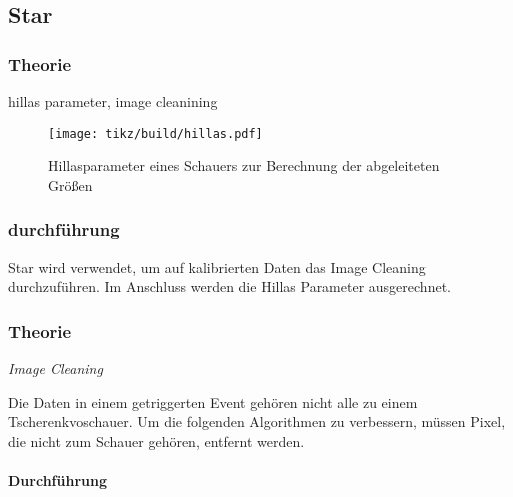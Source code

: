 \subsection{Star}%
\label{sub:star}
\subsubsection{Theorie}
hillas parameter, image cleanining
\begin{figure}
	\centering
	\texttt{[image: tikz/build/hillas.pdf]}
	\caption{Hillasparameter eines Schauers zur Berechnung der abgeleiteten Größen}
	\label{fig:hillas}
\end{figure}

\subsubsection{durchführung}

Star wird verwendet, um auf kalibrierten Daten
das Image Cleaning
durchzuführen.
Im Anschluss werden die Hillas Parameter ausgerechnet.

\subsubsection*{Theorie}%
\label{ssub:theorie}

\textit{Image Cleaning}

Die Daten in einem getriggerten Event gehören nicht alle zu einem
Tscherenkvoschauer.
Um die folgenden Algorithmen zu verbessern,
müssen Pixel, die nicht zum Schauer gehören, entfernt werden.

\paragraph{Durchführung}%
\label{par:star-durchfuerung}
